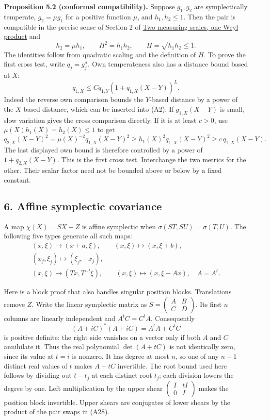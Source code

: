 \documentclass[
  11pt,
]{article}
\begin{document}
\textbf{Proposition 5.2 (conformal compatibility).} Suppose \(g_1,g_2\)
are symplectically temperate, \(g_2=\mu g_1\) for a positive function
\(\mu\), and \(h_1,h_2\le1\). Then the pair is compatible in the precise
sense of Section 2 of \href{weyl-metric-products.pdf}{Two measuring
scales, one Weyl product} and \[
h_2=\mu h_1,\qquad H^2=h_1h_2,\qquad H=\sqrt{h_1h_2}\le1.
\tag{A27}
\] The identities follow from quadratic scaling and the definition of
\(H\). To prove the first cross test, write \(q_j=g_j^\sigma\). Own
temperateness also has a distance bound based at \(X\): \[
q_{1,X}\le Cq_{1,Y}(1+q_{1,X}(X-Y))^L.
\] Indeed the reverse own comparison bounds the \(Y\)-based distance by
a power of the \(X\)-based distance, which can be inserted into (A2). If
\(g_{1,X}(X-Y)\) is small, slow variation gives the cross comparison
directly. If it is at least \(c>0\), use \(\mu(X)h_1(X)=h_2(X)\le1\) to
get \[
q_{2,X}(X-Y)^2
=\mu(X)^{-2}q_{1,X}(X-Y)^2
\ge h_1(X)^2q_{1,X}(X-Y)^2
\ge c\,q_{1,X}(X-Y).
\] The last displayed own bound is therefore controlled by a power of
\(1+q_{2,X}(X-Y)\). This is the first cross test. Interchange the two
metrics for the other. Their scalar factor need not be bounded above or
below by a fixed constant.

\subsection{6. Affine symplectic
covariance}\label{affine-symplectic-covariance}

A map \(\chi(X)=SX+Z\) is affine symplectic when
\(\sigma(ST,SU)=\sigma(T,U)\). The following five types generate all
such maps: \[
\begin{gathered}
(x,\xi)\mapsto(x+a,\xi),\qquad
(x,\xi)\mapsto(x,\xi+b),\\
(x_j,\xi_j)\mapsto(\xi_j,-x_j),\\
(x,\xi)\mapsto(Tx,T^{-t}\xi),\qquad
(x,\xi)\mapsto(x,\xi-Ax),\quad A=A^t.
\end{gathered}
\tag{A28}
\]

Here is a block proof that also handles singular position blocks.
Translations remove \(Z\). Write the linear symplectic matrix as
\(S=\left(\begin{smallmatrix}A&B\\ C&D\end{smallmatrix}\right)\). Its
first \(n\) columns are linearly independent and \(A^tC=C^tA\).
Consequently \[
(A+iC)^*(A+iC)=A^tA+C^tC
\] is positive definite: the right side vanishes on a vector only if
both \(A\) and \(C\) annihilate it. Thus the real polynomial
\(\det(A+tC)\) is not identically zero, since its value at \(t=i\) is
nonzero. It has degree at most \(n\), so one of any \(n+1\) distinct
real values of \(t\) makes \(A+tC\) invertible. The root bound used here
follows by dividing out \(t-t_j\) at each distinct root \(t_j\); each
division lowers the degree by one. Left multiplication by the upper
shear \(\left(\begin{smallmatrix}I&tI\\0&I\end{smallmatrix}\right)\)
makes the position block invertible. Upper shears are conjugates of
lower shears by the product of the pair swaps in (A28).
\end{document}
